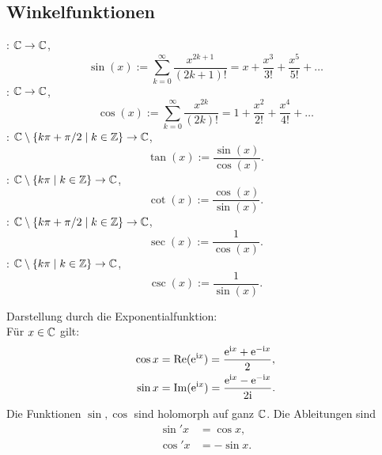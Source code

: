 \subsection{Winkelfunktionen}
\begin{definition}[Winkelfunktionen]
: $\mathbb C\to\mathbb C$,
\begin{equation}
\sin(x) := \sum_{k=0}^\infty \frac{x^{2k+1}}{(2k+1)!}
= x+\frac{x^3}{3!}+\frac{x^5}{5!}+\ldots
\end{equation}
\indent
{}: $\mathbb C\to\mathbb C$,
\begin{equation}
\cos(x) := \sum_{k=0}^\infty \frac{x^{2k}}{(2k)!}
= 1+\frac{x^2}{2!}+\frac{x^4}{4!}+\ldots
\end{equation}
\indent
{}: $\mathbb C\setminus\{k\pi+\pi/2\mid k\in\mathbb Z\}\to\mathbb C$,
\begin{equation}
\tan(x) := \frac{\sin(x)}{\cos(x)}.
\end{equation}
\indent
{}: $\mathbb C\setminus\{k\pi\mid k\in\mathbb Z\}\to\mathbb C$,
\begin{equation}
\cot(x) := \frac{\cos(x)}{\sin(x)}.
\end{equation}
\indent
{}: $\mathbb C\setminus\{k\pi+\pi/2\mid k\in\mathbb Z\}\to\mathbb C$,
\begin{equation}
\sec(x) := \frac{1}{\cos(x)}.
\end{equation}
\indent
{}: $\mathbb C\setminus\{k\pi\mid k\in\mathbb Z\}\to\mathbb C$,
\begin{equation}
\csc(x) := \frac{1}{\sin(x)}.
\end{equation}
\end{definition}
\noindent
Darstellung durch die Exponentialfunktion:\\
Für $x\in\mathbb C$ gilt:
\begin{align}
\cos x &= \operatorname{Re}(\mathrm e^{\mathrm i x}) = \frac{\mathrm e^{\mathrm i x}+\mathrm e^{-\mathrm i x}}{2},\\
\sin x &= \operatorname{Im}(\mathrm e^{\mathrm i x}) = \frac{\mathrm e^{\mathrm i x}-\mathrm e^{-\mathrm i x}}{2\mathrm i}.
\end{align}
Die Funktionen $\sin, \cos$ sind holomorph auf ganz $\mathbb C$.
Die Ableitungen sind
\begin{align}
\sin' x &= \cos x,\\
\cos' x &= -\sin x.
\end{align}

